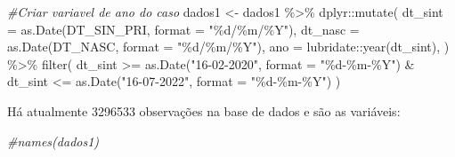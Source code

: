 \documentclass[
]{article}
\newenvironment{Shaded}{\begin{snugshade}}{\end{snugshade}}
\newcommand{\AttributeTok}[1]{\textcolor[rgb]{0.77,0.63,0.00}{#1}}
\newcommand{\CommentTok}[1]{\textcolor[rgb]{0.56,0.35,0.01}{\textit{#1}}}
\newcommand{\FunctionTok}[1]{\textcolor[rgb]{0.00,0.00,0.00}{#1}}
\newcommand{\NormalTok}[1]{#1}
\newcommand{\OtherTok}[1]{\textcolor[rgb]{0.56,0.35,0.01}{#1}}
\newcommand{\SpecialCharTok}[1]{\textcolor[rgb]{0.00,0.00,0.00}{#1}}
\newcommand{\StringTok}[1]{\textcolor[rgb]{0.31,0.60,0.02}{#1}}
\begin{document}
\begin{Shaded}
\begin{Highlighting}[]
\CommentTok{\#Criar variavel de ano do caso}
\NormalTok{dados1 }\OtherTok{\textless{}{-}}\NormalTok{  dados1 }\SpecialCharTok{\%\textgreater{}\%}
\NormalTok{  dplyr}\SpecialCharTok{::}\FunctionTok{mutate}\NormalTok{(}
    \AttributeTok{dt\_sint =} \FunctionTok{as.Date}\NormalTok{(DT\_SIN\_PRI, }\AttributeTok{format =} \StringTok{"\%d/\%m/\%Y"}\NormalTok{),}
    \AttributeTok{dt\_nasc =} \FunctionTok{as.Date}\NormalTok{(DT\_NASC, }\AttributeTok{format =} \StringTok{"\%d/\%m/\%Y"}\NormalTok{),}
    \AttributeTok{ano =}\NormalTok{ lubridate}\SpecialCharTok{::}\FunctionTok{year}\NormalTok{(dt\_sint),}
\NormalTok{  ) }\SpecialCharTok{\%\textgreater{}\%}
  \FunctionTok{filter}\NormalTok{(}
\NormalTok{    dt\_sint }\SpecialCharTok{\textgreater{}=} \FunctionTok{as.Date}\NormalTok{(}\StringTok{"16{-}02{-}2020"}\NormalTok{, }\AttributeTok{format =} \StringTok{"\%d{-}\%m{-}\%Y"}\NormalTok{) }\SpecialCharTok{\&}
\NormalTok{      dt\_sint }\SpecialCharTok{\textless{}=} \FunctionTok{as.Date}\NormalTok{(}\StringTok{"16{-}07{-}2022"}\NormalTok{, }\AttributeTok{format =} \StringTok{"\%d{-}\%m{-}\%Y"}\NormalTok{)}
\NormalTok{  ) }
\end{Highlighting}
\end{Shaded}

Há atualmente 3296533 observações na base de dados e são as variáveis:

\begin{Shaded}
\begin{Highlighting}[]
\CommentTok{\#names(dados1)}
\end{Highlighting}
\end{Shaded}
\end{document}
